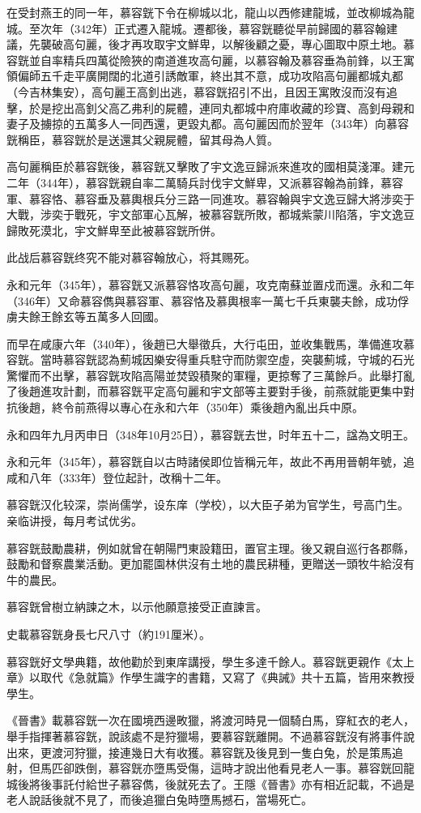 在受封燕王的同一年，慕容皝下令在柳城以北，龍山以西修建龍城，並改柳城為龍城。至次年（342年）正式遷入龍城。遷都後，慕容皝聽從早前歸國的慕容翰建議，先襲破高句麗，後才再攻取宇文鮮卑，以解後顧之憂，專心圖取中原土地。慕容皝並自率精兵四萬從險狹的南道進攻高句麗，以慕容翰及慕容垂為前鋒，以王寓領偏師五千走平廣開闊的北道引誘敵軍，終出其不意，成功攻陷高句麗都城丸都（今吉林集安），高句麗王高釗出逃，慕容皝招引不出，且因王寓敗沒而沒有追擊，於是挖出高釗父高乙弗利的屍體，連同丸都城中府庫收藏的珍寶、高釗母親和妻子及擄掠的五萬多人一同西還，更毀丸都。高句麗因而於翌年（343年）向慕容皝稱臣，慕容皝於是送還其父親屍體，留其母為人質。

高句麗稱臣於慕容皝後，慕容皝又擊敗了宇文逸豆歸派來進攻的國相莫淺渾。建元二年（344年），慕容皝親自率二萬騎兵討伐宇文鮮卑，又派慕容翰為前鋒，慕容軍、慕容恪、慕容垂及慕輿根兵分三路一同進攻。慕容翰與宇文逸豆歸大將涉奕于大戰，涉奕于戰死，宇文部軍心瓦解，被慕容皝所敗，都城紫蒙川陷落，宇文逸豆歸敗死漠北，宇文鮮卑至此被慕容皝所併。

此战后慕容皝终究不能对慕容翰放心，将其赐死。

永和元年（345年），慕容皝又派慕容恪攻高句麗，攻克南蘇並置戍而還。永和二年（346年）又命慕容儁與慕容軍、慕容恪及慕輿根率一萬七千兵東襲夫餘，成功俘虜夫餘王餘玄等五萬多人回國。

而早在咸康六年（340年），後趙已大舉徵兵，大行屯田，並收集戰馬，準備進攻慕容皝。當時慕容皝認為薊城因樂安得重兵駐守而防禦空虛，突襲薊城，守城的石光驚懼而不出擊，慕容皝攻陷高陽並焚毀積聚的軍糧，更掠奪了三萬餘戶。此舉打亂了後趙進攻計劃，而慕容皝平定高句麗和宇文部等主要對手後，前燕就能更集中對抗後趙，終令前燕得以專心在永和六年（350年）乘後趙內亂出兵中原。

永和四年九月丙申日（348年10月25日），慕容皝去世，时年五十二，諡為文明王。

永和元年（345年），慕容皝自以古時諸侯即位皆稱元年，故此不再用晉朝年號，追咸和八年（333年）登位起計，改稱十二年。

慕容皝汉化较深，崇尚儒学，设东庠（学校），以大臣子弟为官学生，号高门生。亲临讲授，每月考试优劣。

慕容皝鼓勵農耕，例如就曾在朝陽門東設籍田，置官主理。後又親自巡行各郡縣，鼓勵和督察農業活動。更加罷園林供沒有土地的農民耕種，更贈送一頭牧牛給沒有牛的農民。

慕容皝曾樹立納諫之木，以示他願意接受正直諫言。

史載慕容皝身長七尺八寸（約191厘米）。

慕容皝好文學典籍，故他勸於到東庠講授，學生多達千餘人。慕容皝更親作《太上章》以取代《急就篇》作學生識字的書籍，又寫了《典誡》共十五篇，皆用來教授學生。

《晉書》載慕容皝一次在國境西邊畋獵，將渡河時見一個騎白馬，穿紅衣的老人，舉手指揮著慕容皝，說該處不是狩獵場，要慕容皝離開。不過慕容皝沒有將事件說出來，更渡河狩獵，接連幾日大有收獲。慕容皝及後見到一隻白兔，於是策馬追射，但馬匹卻跌倒，慕容皝亦墮馬受傷，這時才說出他看見老人一事。慕容皝回龍城後將後事託付給世子慕容儁，後就死去了。王隱《晉書》亦有相近記載，不過是老人說話後就不見了，而後追獵白兔時墮馬撼石，當場死亡。





